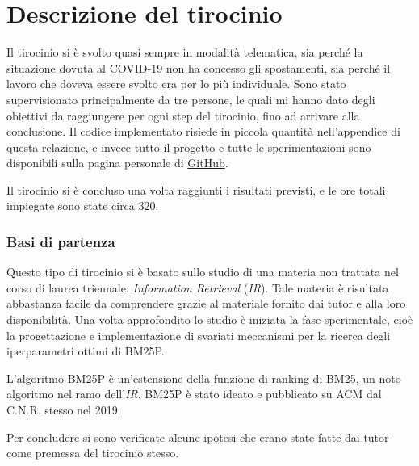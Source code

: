 \chapter{Descrizione del tirocinio}

Il tirocinio si è svolto quasi sempre in modalità telematica,
sia perché la situazione dovuta al COVID-19 non ha concesso
gli spostamenti, sia perché  il lavoro che doveva essere svolto
era per lo più individuale.
Sono stato supervisionato principalmente da tre persone,
le quali mi hanno dato degli obiettivi da raggiungere per ogni
step del tirocinio,
fino ad arrivare alla conclusione.
Il codice implementato risiede in piccola
quantità nell'appendice di questa relazione,
e invece tutto il progetto e tutte le sperimentazioni
sono disponibili sulla pagina personale di \href{https://github.com/federicosilvestri/bm25p-thesis}{GitHub}.

Il tirocinio si è concluso una volta raggiunti i risultati
previsti, e le ore totali impiegate sono state circa 320.

\subsection{Basi di partenza}
Questo tipo di tirocinio si è basato
sullo studio di una materia non trattata nel corso di laurea triennale:
\textit{Information Retrieval} (\textit{IR}).
Tale materia è risultata abbastanza facile da comprendere grazie
al materiale fornito dai tutor e alla loro disponibilità.
Una volta approfondito lo studio è iniziata la fase sperimentale,
cioè la progettazione e implementazione di svariati meccanismi per la ricerca 
degli iperparametri ottimi di BM25P.

L'algoritmo BM25P è un'estensione della funzione di ranking
di BM25, un noto algoritmo nel ramo dell'\textit{IR}.
BM25P è stato ideato e pubblicato su ACM dal C.N.R.
stesso nel 2019.\cite{10.1145/3331184.3331373}

Per concludere si sono verificate alcune ipotesi
che erano state fatte dai tutor come premessa
del tirocinio stesso.


